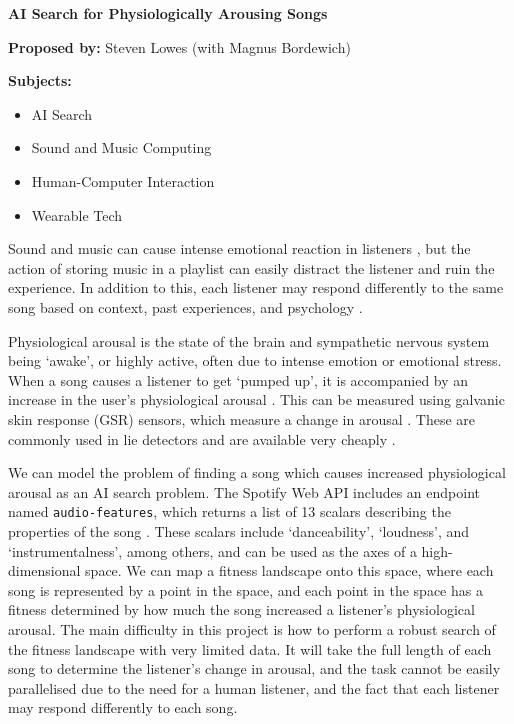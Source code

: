 \documentclass[a4paper,12pt]{article}
\begin{document}
	\begin{center}
		\Huge \textbf{AI Search for Physiologically Arousing Songs}
	\end{center}

	\textbf{Proposed by:} Steven Lowes (with Magnus Bordewich)
	
	\textbf{Subjects:}
	\begin{itemize}
		\item AI Search
		\item Sound and Music Computing
		\item Human-Computer Interaction
		\item Wearable Tech
	\end{itemize}

	Sound and music can cause intense emotional reaction in listeners \citep{arousingMusic}, but the action of storing music in a playlist can easily distract the listener and ruin the experience. In addition to this, each listener may respond differently to the same song based on context, past experiences, and psychology \citep{musicDifferences}.
	
	Physiological arousal is the state of the brain and sympathetic nervous system being `awake', or highly active, often due to intense emotion or emotional stress. When a song causes a listener to get `pumped up', it is accompanied by an increase in the user's physiological arousal \citep{pumpedUp}. This can be measured using galvanic skin response (GSR) sensors, which measure a change in arousal \citep{GSR}. These are commonly used in lie detectors and are available very cheaply \citep{gsrSensor}.
	
	We can model the problem of finding a song which causes increased physiological arousal as an AI search problem. The Spotify Web API includes an endpoint named \verb|audio-features|, which returns a list of 13 scalars describing the properties of the song \citep{audioFeatures}. These scalars include `danceability', `loudness', and `instrumentalness', among others, and can be used as the axes of a high-dimensional space. We can map a fitness landscape onto this space, where each song is represented by a point in the space, and each point in the space has a fitness determined by how much the song increased a listener's physiological arousal.
	\newpage
	The main difficulty in this project is how to perform a robust search of the fitness landscape with very limited data. It will take the full length of each song to determine the listener's change in arousal, and the task cannot be easily parallelised due to the need for a human listener, and the fact that each listener may respond differently to each song.
	
\end{document}
